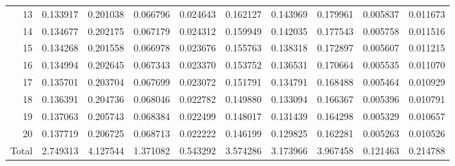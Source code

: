 \documentclass[lettersize,journal]{IEEEtran}
\begin{document}
\begin{table}[ht!]
\begin{center}
\begin{tabular}{r|l|l|l|l|l|l|l|l|l}
      13 & 0.133917 & 0.201038 & 0.066796 & 0.024643 & 0.162127 & 0.143969 & 0.179961 & 0.005837 & 0.011673 \\
      14 & 0.134677 & 0.202175 & 0.067179 & 0.024312 & 0.159949 & 0.142035 & 0.177543 & 0.005758 & 0.011516 \\
      15 & 0.134268 & 0.201558 & 0.066978 & 0.023676 & 0.155763 & 0.138318 & 0.172897 & 0.005607 & 0.011215 \\
      16 & 0.134994 & 0.202645 & 0.067343 & 0.023370 & 0.153752 & 0.136531 & 0.170664 & 0.005535 & 0.011070 \\
      17 & 0.135701 & 0.203704 & 0.067699 & 0.023072 & 0.151791 & 0.134791 & 0.168488 & 0.005464 & 0.010929 \\
      18 & 0.136391 & 0.204736 & 0.068046 & 0.022782 & 0.149880 & 0.133094 & 0.166367 & 0.005396 & 0.010791 \\
      19 & 0.137063 & 0.205743 & 0.068384 & 0.022499 & 0.148017 & 0.131439 & 0.164298 & 0.005329 & 0.010657 \\
      20 & 0.137719 & 0.206725 & 0.068713 & 0.022222 & 0.146199 & 0.129825 & 0.162281 & 0.005263 & 0.010526 \\
      Total & 2.749313 & 4.127544 & 1.371082 & 0.543292 & 3.574286 & 3.173966 & 3.967458 & 0.121463 & 0.214788 \\
    \end{tabular}
  \end{center}
\end{table}
\end{document}
